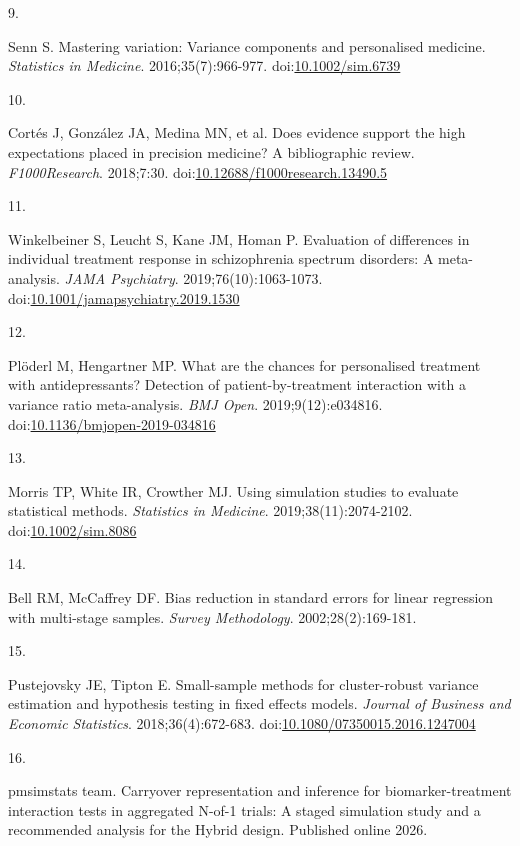 \documentclass[
  11pt,
]{article}
\newlength{\cslhangindent}
\newlength{\csllabelwidth}
\newenvironment{CSLReferences}[2] %
 {\begin{list}{}{%
  \setlength{\itemindent}{0pt}
  \setlength{\leftmargin}{0pt}
  \setlength{\parsep}{0pt}
  \ifodd #1
   \setlength{\leftmargin}{\cslhangindent}
   \setlength{\itemindent}{-1\cslhangindent}
  \fi
  \setlength{\itemsep}{#2\baselineskip}}}
 {\end{list}}
\newcommand{\CSLLeftMargin}[1]{\parbox[t]{\csllabelwidth}{\strut#1\strut}}
\newcommand{\CSLRightInline}[1]{\parbox[t]{\linewidth - \csllabelwidth}{\strut#1\strut}}
\begin{document}
\begin{CSLReferences}{0}{1}
\CSLLeftMargin{9. }%
\CSLRightInline{Senn S. Mastering variation: Variance components and personalised medicine. \emph{Statistics in Medicine}. 2016;35(7):966-977. doi:\href{https://doi.org/10.1002/sim.6739}{10.1002/sim.6739}}

\CSLLeftMargin{10. }%
\CSLRightInline{Cortés J, González JA, Medina MN, et al. Does evidence support the high expectations placed in precision medicine? {A} bibliographic review. \emph{F1000Research}. 2018;7:30. doi:\href{https://doi.org/10.12688/f1000research.13490.5}{10.12688/f1000research.13490.5}}

\CSLLeftMargin{11. }%
\CSLRightInline{Winkelbeiner S, Leucht S, Kane JM, Homan P. Evaluation of differences in individual treatment response in schizophrenia spectrum disorders: A meta-analysis. \emph{JAMA Psychiatry}. 2019;76(10):1063-1073. doi:\href{https://doi.org/10.1001/jamapsychiatry.2019.1530}{10.1001/jamapsychiatry.2019.1530}}

\CSLLeftMargin{12. }%
\CSLRightInline{Plöderl M, Hengartner MP. What are the chances for personalised treatment with antidepressants? {Detection} of patient-by-treatment interaction with a variance ratio meta-analysis. \emph{BMJ Open}. 2019;9(12):e034816. doi:\href{https://doi.org/10.1136/bmjopen-2019-034816}{10.1136/bmjopen-2019-034816}}

\CSLLeftMargin{13. }%
\CSLRightInline{Morris TP, White IR, Crowther MJ. Using simulation studies to evaluate statistical methods. \emph{Statistics in Medicine}. 2019;38(11):2074-2102. doi:\href{https://doi.org/10.1002/sim.8086}{10.1002/sim.8086}}

\CSLLeftMargin{14. }%
\CSLRightInline{Bell RM, McCaffrey DF. Bias reduction in standard errors for linear regression with multi-stage samples. \emph{Survey Methodology}. 2002;28(2):169-181.}

\CSLLeftMargin{15. }%
\CSLRightInline{Pustejovsky JE, Tipton E. Small-sample methods for cluster-robust variance estimation and hypothesis testing in fixed effects models. \emph{Journal of Business and Economic Statistics}. 2018;36(4):672-683. doi:\href{https://doi.org/10.1080/07350015.2016.1247004}{10.1080/07350015.2016.1247004}}

\CSLLeftMargin{16. }%
\CSLRightInline{{pmsimstats team}. Carryover representation and inference for biomarker-treatment interaction tests in aggregated {N}-of-1 trials: A staged simulation study and a recommended analysis for the {Hybrid} design. Published online 2026.}

\end{CSLReferences}
\end{document}
